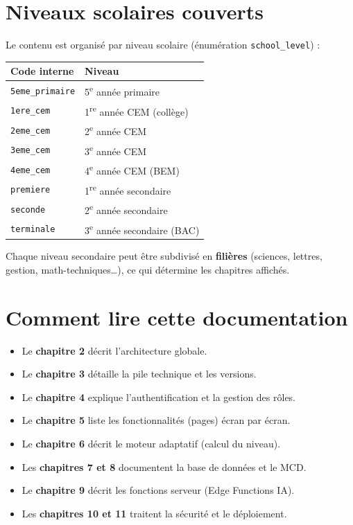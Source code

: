 \section{Niveaux scolaires couverts}
Le contenu est organisé par niveau scolaire (énumération \texttt{school\_level}) :
\begin{center}
\begin{tabular}{ll}
\toprule
\textbf{Code interne} & \textbf{Niveau} \\
\midrule
\texttt{5eme\_primaire} & 5\textsuperscript{e} année primaire \\
\texttt{1ere\_cem} & 1\textsuperscript{re} année CEM (collège) \\
\texttt{2eme\_cem} & 2\textsuperscript{e} année CEM \\
\texttt{3eme\_cem} & 3\textsuperscript{e} année CEM \\
\texttt{4eme\_cem} & 4\textsuperscript{e} année CEM (BEM) \\
\texttt{premiere} & 1\textsuperscript{re} année secondaire \\
\texttt{seconde} & 2\textsuperscript{e} année secondaire \\
\texttt{terminale} & 3\textsuperscript{e} année secondaire (BAC) \\
\bottomrule
\end{tabular}
\end{center}

Chaque niveau secondaire peut être subdivisé en \textbf{filières} (sciences,
lettres, gestion, math-techniques\dots), ce qui détermine les chapitres affichés.

\section{Comment lire cette documentation}
\begin{itemize}
  \item Le \textbf{chapitre 2} décrit l'architecture globale.
  \item Le \textbf{chapitre 3} détaille la pile technique et les versions.
  \item Le \textbf{chapitre 4} explique l'authentification et la gestion des rôles.
  \item Le \textbf{chapitre 5} liste les fonctionnalités (pages) écran par écran.
  \item Le \textbf{chapitre 6} décrit le moteur adaptatif (calcul du niveau).
  \item Les \textbf{chapitres 7 et 8} documentent la base de données et le MCD.
  \item Le \textbf{chapitre 9} décrit les fonctions serveur (Edge Functions IA).
  \item Les \textbf{chapitres 10 et 11} traitent la sécurité et le déploiement.
\end{itemize}
